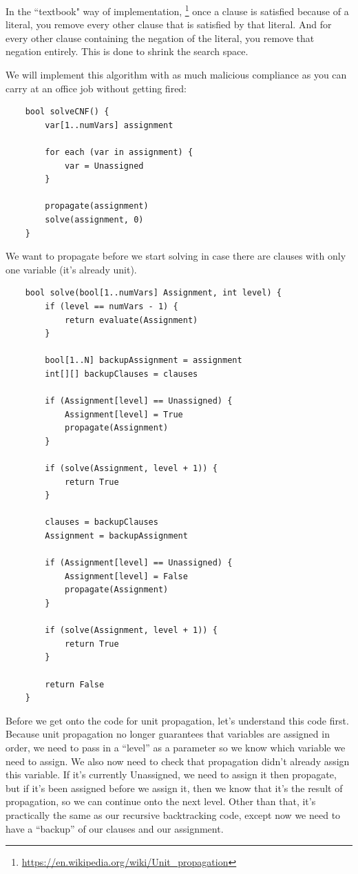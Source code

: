 \documentclass[../main.tex]{subfiles}
\begin{document}
In the ``textbook" way of implementation,
\footnote{\url{https://en.wikipedia.org/wiki/Unit_propagation}} 
once a clause is satisfied because of a literal, you remove every other
clause that is satisfied by that literal. And for every other clause containing 
the negation of the literal, you remove that negation entirely. This is done to shrink the 
search space.

We will implement this algorithm with as much malicious compliance as you can 
carry at an office job without getting fired:

\begin{lstlisting}
    bool solveCNF() {
        var[1..numVars] assignment

        for each (var in assignment) {
            var = Unassigned
        }

        propagate(assignment)
        solve(assignment, 0)
    }
\end{lstlisting}

We want to propagate before we start solving in case there are clauses with 
only one variable (it's already unit).

\begin{lstlisting}
    bool solve(bool[1..numVars] Assignment, int level) {
        if (level == numVars - 1) {
            return evaluate(Assignment)
        }

        bool[1..N] backupAssignment = assignment
        int[][] backupClauses = clauses

        if (Assignment[level] == Unassigned) {
            Assignment[level] = True
            propagate(Assignment)
        }

        if (solve(Assignment, level + 1)) {
            return True
        }

        clauses = backupClauses
        Assignment = backupAssignment

        if (Assignment[level] == Unassigned) {
            Assignment[level] = False
            propagate(Assignment)
        }

        if (solve(Assignment, level + 1)) {
            return True
        }

        return False
    }
\end{lstlisting}

Before we get onto the code for unit propagation, let's understand this code first. 
Because unit propagation no longer guarantees that variables are assigned in order, 
we need to pass in a ``level'' as a parameter so we know which variable we need to 
assign. We also now need to check that propagation didn't already assign this variable. 
If it's currently Unassigned, we need to assign it then propagate, but if it's been 
assigned before we assign it, then we know that it's the result of propagation, so we 
can continue onto the next level. Other than that, it's practically the same as our recursive 
backtracking code, except now we need to have a ``backup'' of our clauses and our assignment. 
\end{document}
